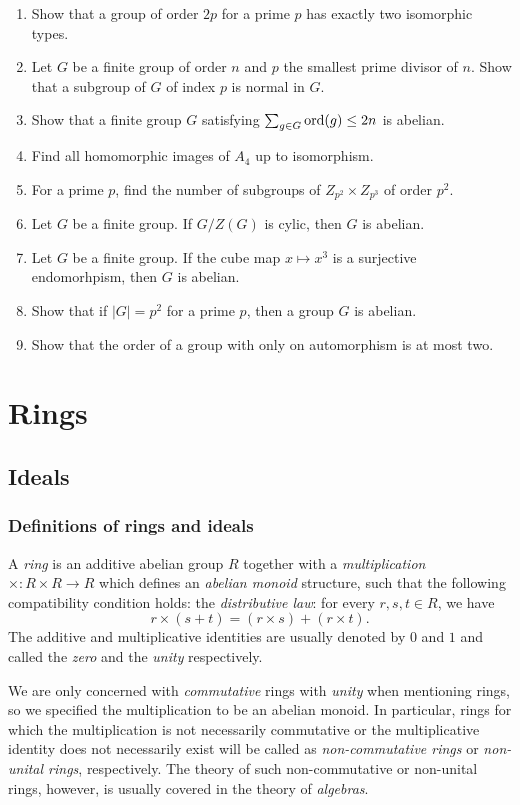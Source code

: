 \documentclass{../../large}
\begin{document}
\begin{enumerate}
\item Show that a group of order $2p$ for a prime $p$ has exactly two isomorphic types.
\item Let $G$ be a finite group of order $n$ and $p$ the smallest prime divisor of $n$. Show that a subgroup of $G$ of index $p$ is normal in $G$.
\item Show that a finite group $G$ satisfying $\sum_{g\in G}\operatorname{ord}(g)\le2n$ is abelian.
\item Find all homomorphic images of $A_4$ up to isomorphism.
\item For a prime $p$, find the number of subgroups of $Z_{p^2}\times Z_{p^3}$ of order $p^2$.
\item Let $G$ be a finite group. If $G/Z(G)$ is cylic, then $G$ is abelian.
\item Let $G$ be a finite group. If the cube map $x\mapsto x^3$ is a surjective endomorhpism, then $G$ is abelian.
\item Show that if $|G|=p^2$ for a prime $p$, then a group $G$ is abelian.
\item Show that the order of a group with only on automorphism is at most two.
\end{enumerate}










\part{Rings}
\chapter{Ideals}
\section{Definitions of rings and ideals}
\begin{prb}
A \emph{ring} is an additive abelian group $R$ together with a \emph{multiplication} $\times:R\times R\to R$ which defines an \emph{abelian monoid} structure, such that the following compatibility condition holds: the \emph{distributive law}: for every $r,s,t\in R$, we have
\[r\times(s+t)=(r\times s)+(r\times t).\]
The additive and multiplicative identities are usually denoted by $0$ and $1$ and called the \emph{zero} and the \emph{unity} respectively.

We are only concerned with \emph{commutative} rings with \emph{unity} when mentioning rings, so we specified the multiplication to be an abelian monoid.
In particular, rings for which the multiplication is not necessarily commutative or the multiplicative identity does not necessarily exist will be called as \emph{non-commutative rings} or \emph{non-unital rings}, respectively.
The theory of such non-commutative or non-unital rings, however, is usually covered in the theory of \emph{algebras}.
\end{prb}
\end{document}
